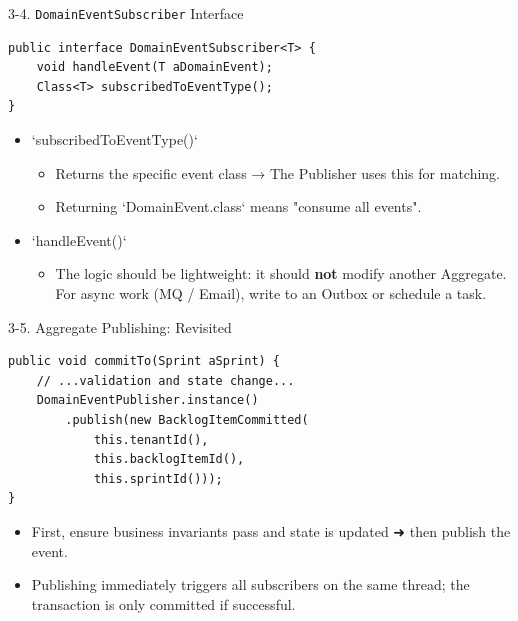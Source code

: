 \documentclass{beamer}
\begin{document}
\begin{frame}[fragile]{3-4. \texttt{DomainEventSubscriber} Interface}
  \lstset{language=Java, basicstyle=\ttfamily\scriptsize}
  \begin{lstlisting}
public interface DomainEventSubscriber<T> {
    void handleEvent(T aDomainEvent);
    Class<T> subscribedToEventType();
}
  \end{lstlisting}
  \begin{itemize}
    \item `subscribedToEventType()`
      \begin{itemize}
        \item Returns the specific event class → The Publisher uses this for matching.
        \item Returning `DomainEvent.class` means "consume all events".
      \end{itemize}
    \item `handleEvent()`
      \begin{itemize}
        \item The logic should be lightweight: it should \textbf{not} modify another Aggregate. For async work (MQ / Email), write to an Outbox or schedule a task.
      \end{itemize}
  \end{itemize}
\end{frame}

\begin{frame}[fragile]{3-5. Aggregate Publishing: Revisited}
  \lstset{language=Java, basicstyle=\ttfamily\scriptsize}
  \begin{lstlisting}
public void commitTo(Sprint aSprint) {
    // ...validation and state change...
    DomainEventPublisher.instance()
        .publish(new BacklogItemCommitted(
            this.tenantId(),
            this.backlogItemId(),
            this.sprintId()));
}
  \end{lstlisting}
  \begin{itemize}
    \item First, ensure business invariants pass and state is updated ➜ then publish the event.
    \item Publishing immediately triggers all subscribers on the same thread; the transaction is only committed if successful.
  \end{itemize}
\end{frame}
\end{document}
